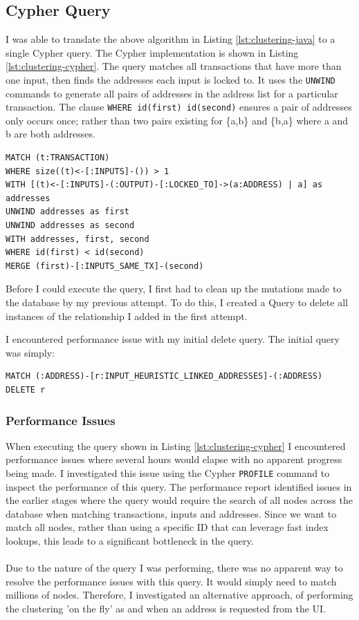 \subsection{Cypher Query}
I was able to translate the above algorithm in Listing \ref{lst:clustering-java} to a single Cypher query. The Cypher implementation is shown in Listing \ref{lst:clustering-cypher}.
The query matches all transactions that have more than one input, then finds the addresses each input is locked to. It uses the \texttt{UNWIND} commands to generate all pairs of addresses in the address list for a particular transaction. The clause \texttt{WHERE id(first) \< id(second)} ensures a pair of addresses only occurs once; rather than two pairs existing for \{a,b\} and \{b,a\} where a and b are both addresses.

\begin{lstlisting}[caption={Cypher Implementation}, label={lst:clustering-cypher}, breaklines=true, basicstyle=\small]
MATCH (t:TRANSACTION)
WHERE size((t)<-[:INPUTS]-()) > 1
WITH [(t)<-[:INPUTS]-(:OUTPUT)-[:LOCKED_TO]->(a:ADDRESS) | a] as addresses
UNWIND addresses as first
UNWIND addresses as second
WITH addresses, first, second
WHERE id(first) < id(second)
MERGE (first)-[:INPUTS_SAME_TX]-(second)
\end{lstlisting}

Before I could execute the query, I first had to clean up the mutations made to the database by my previous attempt. To do this, I created a Query to delete all instances of the relationship I added in the first attempt. 

I encountered performance issue with my initial delete query. 
The initial query was simply:
\begin{lstlisting}
MATCH (:ADDRESS)-[r:INPUT_HEURISTIC_LINKED_ADDRESSES]-(:ADDRESS)
DELETE r
\end{lstlisting}

\subsubsection{Performance Issues}
When executing the query shown in Listing \ref{lst:clustering-cypher} I encountered performance issues where several hours would elapse with no apparent progress being made. I investigated this issue using the Cypher \texttt{PROFILE} command to inspect the performance of this query. The performance report identified issues in the earlier stages where the query would require the search of all nodes across the database when matching transactions, inputs and addresses. Since we want to match all nodes, rather than using a specific ID that can leverage fast index lookups, this leads to a significant bottleneck in the query. 
\\\\
Due to the nature of the query I was performing, there was no apparent way to resolve the performance issues with this query. It would simply need to match millions of nodes. Therefore, I investigated an alternative approach, of performing the clustering 'on the fly' as and when an address is requested from the UI. 

